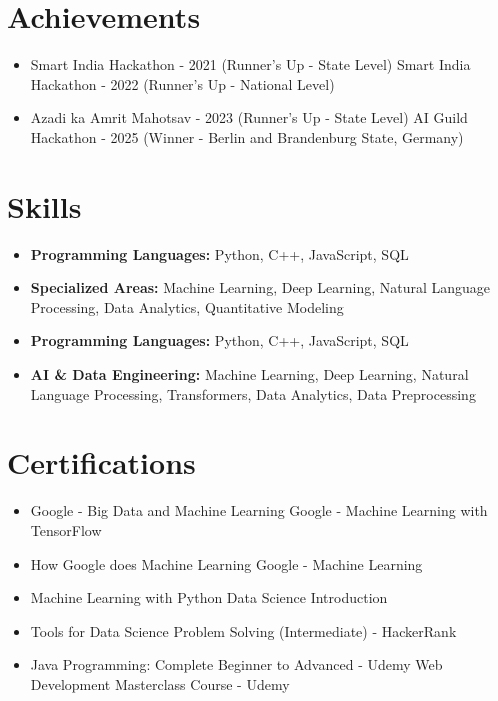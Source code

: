 \documentclass[a4paper,10pt]{article}
\begin{document}
\section*{Achievements}
\begin{itemize}
\item Smart India Hackathon - 2021 (Runner's Up - State Level) \hfill Smart India Hackathon - 2022 (Runner's Up - National Level)
\item Azadi ka Amrit Mahotsav - 2023 (Runner's Up - State Level) \hfill AI Guild Hackathon - 2025 (Winner - Berlin and Brandenburg State, Germany)
\end{itemize}

\section*{Skills}
\begin{itemize}
  \item \textbf{Programming Languages:} Python, C++, JavaScript, SQL
  \item \textbf{Specialized Areas:} Machine Learning, Deep Learning, Natural Language Processing, Data Analytics, Quantitative Modeling
  \item \textbf{Programming Languages:} Python, C++, JavaScript, SQL
  \item \textbf{AI \& Data Engineering:} Machine Learning, Deep Learning, Natural Language Processing, Transformers, Data Analytics, Data Preprocessing
\end{itemize}

\section*{Certifications}
\begin{itemize}
\item Google - Big Data and Machine Learning \hfill Google - Machine Learning with TensorFlow
\item How Google does Machine Learning \hfill Google - Machine Learning
\item Machine Learning with Python \hfill Data Science Introduction
\item Tools for Data Science \hfill Problem Solving (Intermediate) - HackerRank
\item Java Programming: Complete Beginner to Advanced - Udemy \hfill Web Development Masterclass Course - Udemy
\end{itemize}
\end{document}
